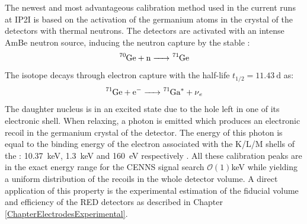 The newest and most advantageous calibration method used in the current runs at IP2I is based on the activation of the germanium atoms in the crystal of the detectors with thermal neutrons. The detectors are activated with an intense AmBe neutron source, inducing the neutron capture by the stable :
\begin{equation}
\ce{{}^{70}Ge + n -> {}^{71}Ge}
\end{equation}
The  isotope decays \cite{Abusaleem:2011} through electron capture with the half-life $t_{1/2} = \SI{11.43}{\day}$ as:
\begin{equation}
\ce{^{71}Ge + e^- -> {}^{71}Ga^* + $\nu$_e}
\end{equation}
The daughter nucleus  is in an excited state due to the hole left in one of its electronic shell. When relaxing, a photon is emitted which produces an electronic recoil in the germanium crystal of the detector. The energy of this photon is equal to the binding energy of the electron associated with the K/L/M shells of the : \SI{10.37}{\kilo\eV}, \SI{1.3}{\kilo\eV} and \SI{160}{\eV} respectively \cite{thompson2001x}. All these calibration peaks are in the exact energy range for the CENNS signal search $\mathcal{O}(1)$\si{\kilo\eV} while yielding a uniform distribution of the recoils in the whole detector volume. A direct application of this property is the experimental estimation of the fiducial volume and efficiency of the RED detectors as described in Chapter \ref{ChapterElectrodesExperimental}.




